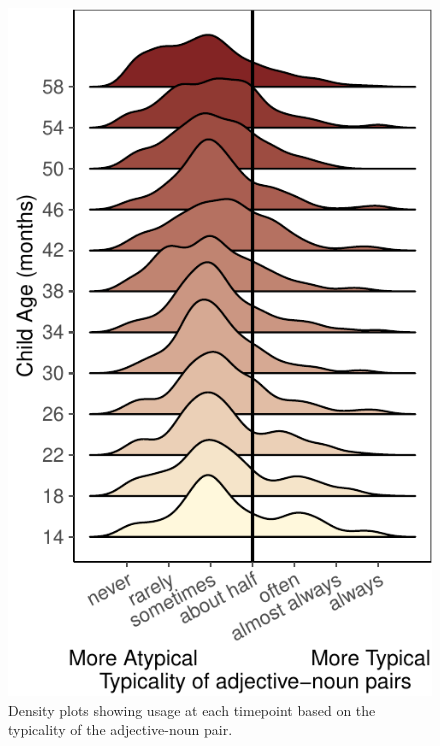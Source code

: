 \documentclass[10pt, letterpaper]{article}
\newenvironment{CodeChunk}{}{}
\begin{document}
\begin{CodeChunk}
\begin{figure}[tb]

{\centering \includegraphics{figs/distribution_plot-1} 

}

\caption[Density plots showing usage at each timepoint based on the typicality of the adjective-noun pair]{Density plots showing usage at each timepoint based on the typicality of the adjective-noun pair.}\label{fig:distribution_plot}
\end{figure}
\end{CodeChunk}
\end{document}
